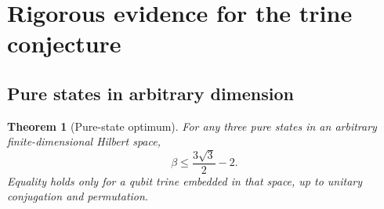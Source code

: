 \documentclass[a4paper,11pt,onecolumn,unpublished]{quantumarticle}
\newtheorem{theorem}{Theorem}[section]
\theoremstyle{definition}
\newcommand{\1}{\mathbf 1}
\begin{document}
\appendix
\section{Rigorous evidence for the trine conjecture}\label{app:evidence}

\subsection{Pure states in arbitrary dimension}

\begin{theorem}[Pure-state optimum]\label{thm:pure}
For any three pure states in an arbitrary finite-dimensional Hilbert space,
\[
 \beta\le\frac{3\sqrt3}{2}-2.
\]
Equality holds only for a qubit trine embedded in that space, up to unitary
conjugation and permutation.
\end{theorem}
\end{document}
